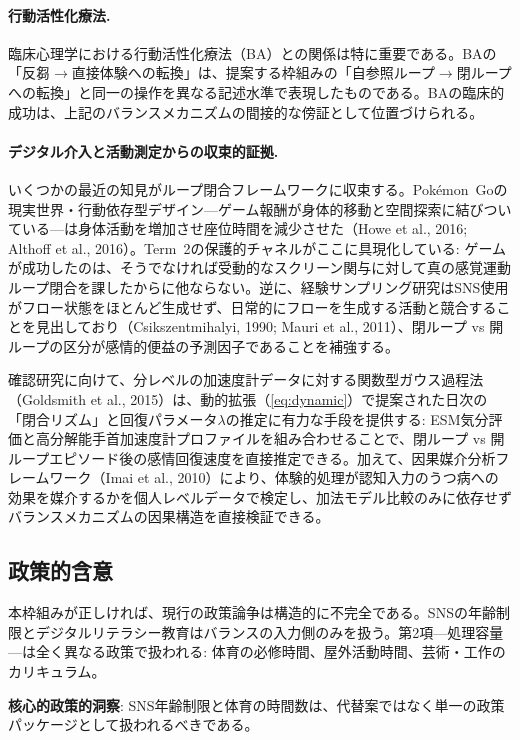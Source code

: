 \documentclass[a4paper,11pt,titlepage]{article}
\begin{document}
\paragraph{行動活性化療法.}
臨床心理学における行動活性化療法（BA）との関係は特に重要である。BAの「反芻$\to$直接体験への転換」は、提案する枠組みの「自参照ループ$\to$閉ループへの転換」と同一の操作を異なる記述水準で表現したものである。BAの臨床的成功は、上記のバランスメカニズムの間接的な傍証として位置づけられる。

\paragraph{デジタル介入と活動測定からの収束的証拠.}
いくつかの最近の知見がループ閉合フレームワークに収束する。Pok\'emon~Goの現実世界・行動依存型デザイン---ゲーム報酬が身体的移動と空間探索に結びついている---は身体活動を増加させ座位時間を減少させた（Howe et al., 2016; Althoff et al., 2016）。Term~2の保護的チャネルがここに具現化している: ゲームが成功したのは、そうでなければ受動的なスクリーン関与に対して真の感覚運動ループ閉合を課したからに他ならない。逆に、経験サンプリング研究はSNS使用がフロー状態をほとんど生成せず、日常的にフローを生成する活動と競合することを見出しており（Csikszentmihalyi, 1990; Mauri et al., 2011）、閉ループ vs 開ループの区分が感情的便益の予測因子であることを補強する。

確認研究に向けて、分レベルの加速度計データに対する関数型ガウス過程法（Goldsmith et al., 2015）は、動的拡張（\cref{eq:dynamic}）で提案された日次の「閉合リズム」と回復パラメータ$\lambda$の推定に有力な手段を提供する: ESM気分評価と高分解能手首加速度計プロファイルを組み合わせることで、閉ループ vs 開ループエピソード後の感情回復速度を直接推定できる。加えて、因果媒介分析フレームワーク（Imai et al., 2010）により、体験的処理が認知入力のうつ病への効果を媒介するかを個人レベルデータで検定し、加法モデル比較のみに依存せずバランスメカニズムの因果構造を直接検証できる。

\subsection{政策的含意}

本枠組みが正しければ、現行の政策論争は構造的に不完全である。SNSの年齢制限とデジタルリテラシー教育はバランスの入力側のみを扱う。第2項---処理容量---は全く異なる政策で扱われる: 体育の必修時間、屋外活動時間、芸術・工作のカリキュラム。

\textbf{核心的政策的洞察}: SNS年齢制限と体育の時間数は、代替案ではなく単一の政策パッケージとして扱われるべきである。
\end{document}
